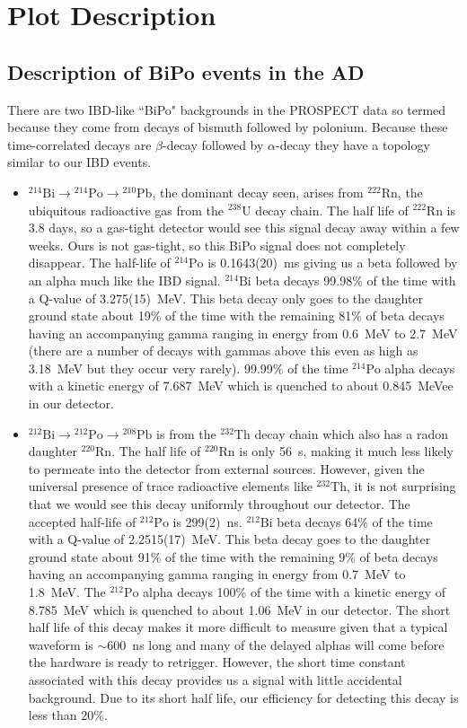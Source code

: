 


\tableofcontents
\listoffigures
\section{Plot Description}
\subsection{Description of BiPo events in the AD}
There are two IBD-like ``BiPo" backgrounds in the PROSPECT data so termed because they come from decays of bismuth followed by polonium. Because these time-correlated decays are $\beta$-decay followed by $\alpha$-decay they have a topology similar to our IBD events. 
\begin{itemize}
\item{$^{214}\textrm{Bi}\rightarrow$$^{214}\textrm{Po}\rightarrow$$^{210}\textrm{Pb}$, the dominant decay seen, arises from $^{222}$Rn, the ubiquitous radioactive gas from the $^{238}$U decay chain. The half life of $^{222}$Rn is 3.8 days, so a gas-tight detector would see this signal decay away within a few weeks. Ours is not gas-tight, so this BiPo signal does not completely disappear. The half-life of $^{214}\textrm{Po}$ is 0.1643(20)~ms giving us a beta followed by an alpha much like the IBD signal. $^{214}\textrm{Bi}$ beta decays 99.98\% of the time with a Q-value of 3.275(15)~MeV. This beta decay only goes to the daughter ground state about 19\% of the time with the remaining 81\% of beta decays having an accompanying gamma ranging in energy from 0.6~MeV to 2.7~MeV (there are a number of decays with gammas above this even as high as 3.18~MeV but they occur very rarely). 99.99\% of the time $^{214}$Po alpha decays with a kinetic energy of 7.687~MeV which is quenched to about 0.845~MeVee in our detector. }
\item{$^{212}\textrm{Bi}\rightarrow$$^{212}\textrm{Po}\rightarrow$$^{208}\textrm{Pb}$ is from the $^{232}$Th decay chain which also has a radon daughter $^{220}$Rn. The half life of $^{220}$Rn is only 56~s, making it much less likely to permeate into the detector from external sources. However, given the universal presence of trace radioactive elements like $^{232}$Th, it is not surprising that we would see this decay uniformly throughout our detector. The accepted half-life of $^{212}\textrm{Po}$ is 299(2)~ns. $^{212}\textrm{Bi}$ beta decays 64\% of the time with a Q-value of 2.2515(17)~MeV. This beta decay goes to the daughter ground state about 91\% of the time with the remaining 9\% of beta decays having an accompanying gamma ranging in energy from 0.7~MeV to 1.8~MeV. The  $^{212}\textrm{Po}$ alpha decays 100\% of the time with a kinetic energy of 8.785~MeV which is quenched to about 1.06~MeV in our detector. The short half life of this decay makes it more difficult to measure given that a typical waveform is $\sim$600~ns long and many of the delayed alphas will come before the hardware is ready to retrigger. However, the short time constant associated with this decay provides us a signal with little accidental background. Due to its short half life, our efficiency for detecting this decay is less than 20\%.}
\end{itemize}


